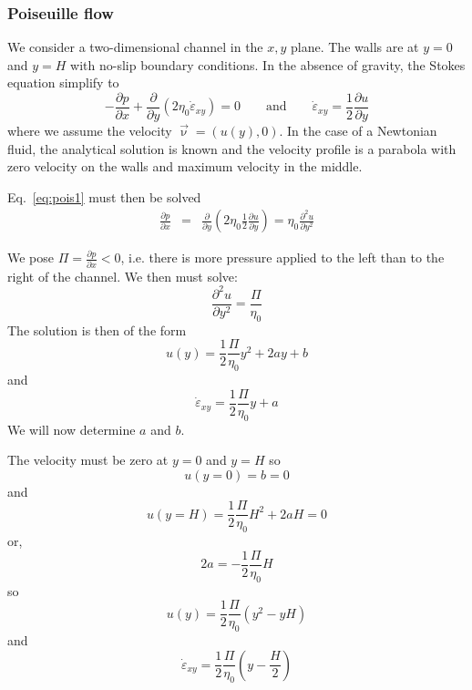 \subsubsection{Poiseuille flow} \label{ss:poiseuille}

We consider a two-dimensional channel in the $x,y$ plane. The walls 
are at $y=0$ and $y=H$ with no-slip boundary conditions. 
In the absence of gravity, the Stokes equation simplify to 
\begin{equation}
-\frac{\partial p}{\partial x}  +\frac{\partial }{\partial y} (2\eta_0 \dot{\varepsilon}_{xy}) =0
\qquad
\text{and}
\qquad
\dot{\varepsilon}_{xy} = \frac{1}{2} \frac{\partial u}{\partial y} 
\label{eq:pois1}
\end{equation}
where we assume the velocity $\vec\upnu=(u(y),0)$.
In the case of a Newtonian fluid, the analytical solution is 
known and the velocity profile is a parabola with zero velocity on the
walls and maximum velocity in the middle. 


Eq.~\eqref{eq:pois1} must then be solved 
\begin{eqnarray}
\frac{\partial p}{\partial x}  
&=&\frac{\partial }{\partial y} \left(2\eta_{0}  \frac{1}{2}\frac{\partial u}{\partial y} \right) 
= \eta_0 \frac{\partial^2 u}{\partial y^2}  
\end{eqnarray}

We pose $\Pi=\frac{\partial p}{\partial x}<0$, i.e. 
there is more pressure applied to the left than to the right of the channel.
We then must solve:
\[
\frac{\partial^2 u}{\partial y^2} = \frac{\Pi}{\eta_0} 
\]
The solution is then of the form
\[
u(y) = \frac{1}{2}\frac{\Pi}{\eta_0} y^2 + 2a y + b
\]
and 
\[
\dot{\varepsilon}_{xy}= \frac{1}{2} \frac{\Pi}{\eta_0}y  + a
\]
We will now determine $a$ and $b$.

The velocity must be zero at $y=0$ and $y=H$ so 
\[
u(y=0)=b=0
\] 
and 
\[
u(y=H)=\frac{1}{2}\frac{\Pi}{\eta_0} H^2 + 2a H =0
\]
or, 
\[
2a=-\frac{1}{2}\frac{\Pi}{\eta_0} H
\]
so 
\begin{equation}
\boxed{
u(y) = \frac{1}{2}\frac{\Pi}{\eta_0} (y^2 - y H)
}
\end{equation}
and 
\begin{equation}
\boxed{
\dot{\varepsilon}_{xy}= \frac{1}{2} \frac{\Pi}{\eta_0} \left(y  - \frac{H}{2} \right)
}
\end{equation}
 


 












